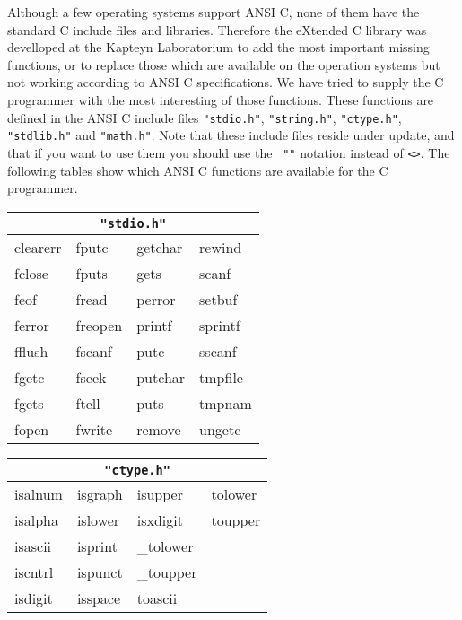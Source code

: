 Although a few operating systems support ANSI C, none of them have the
standard C include files and libraries.  Therefore the eXtended C
library was develloped at the Kapteyn Laboratorium to add the most
important missing functions, or to replace those which are available on
the operation systems but not working according to ANSI C
specifications.  We have tried to supply the C programmer with the most
interesting of those functions.  These functions are defined in the ANSI
C include files {\tt "stdio.h"}, {\tt "string.h"}, {\tt "ctype.h"}, {\tt
"stdlib.h"} and {\tt "math.h"}.  Note that these include files reside
under update, and that if you want to use them you should use the {\tt
""} notation instead of {\tt <>}.  The following tables show which ANSI
C functions are available for the C programmer. 

\begin{center}
\begin{tabular}{|l l l l|}
\hline
\multicolumn{4}{|c|}{\tt "stdio.h"}\\
\hline
clearerr    &fputc       &getchar     &rewind  \\
fclose      &fputs       &gets        &scanf   \\
feof        &fread       &perror      &setbuf  \\
ferror      &freopen     &printf      &sprintf \\
fflush      &fscanf      &putc        &sscanf  \\
fgetc       &fseek       &putchar     &tmpfile \\
fgets       &ftell       &puts        &tmpnam  \\
fopen       &fwrite      &remove      &ungetc  \\
\hline
\end{tabular}
\end{center}

\begin{center}
\begin{tabular}{|l l l l|}
\hline
\multicolumn{4}{|c|}{\tt "ctype.h"}\\
\hline
isalnum     &isgraph     &isupper     &tolower  \\
isalpha     &islower     &isxdigit    &toupper  \\
isascii     &isprint     &\_tolower   &         \\
iscntrl     &ispunct     &\_toupper   &         \\
isdigit     &isspace     &toascii     &         \\
\hline
\end{tabular}
\end{center}

